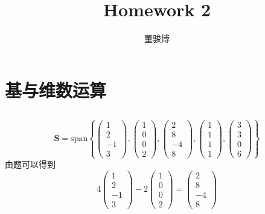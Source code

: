 \documentclass[onecolumn,oneside]{SUSTechHomework}
\author{董骏博}
\title{Homework 2}
\begin{document}
  \maketitle
  \section{基与维数运算}
  \subsection{}
  \[
  \mathbf{S} = \text{span} \left\{
    \begin{pmatrix} 1 \\ 2 \\ -1 \\ 3 \end{pmatrix},
    \begin{pmatrix} 1 \\ 0 \\ 0 \\ 2 \end{pmatrix},
    \begin{pmatrix} 2 \\ 8 \\ -4 \\ 8 \end{pmatrix},
    \begin{pmatrix} 1 \\ 1 \\ 1 \\ 1 \end{pmatrix},
    \begin{pmatrix} 3 \\ 3 \\ 0 \\ 6 \end{pmatrix}
  \right\}
  \]
  由题可以得到
  \[
    4\begin{pmatrix} 1 \\ 2 \\ -1 \\ 3 \end{pmatrix} - 2\begin{pmatrix} 1 \\ 0 \\ 0 \\ 2 \end{pmatrix} = \begin{pmatrix} 2 \\ 8 \\ -4 \\ 8 \end{pmatrix}
  \]
\end{document}
